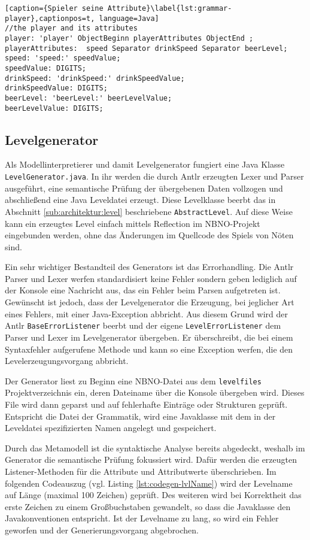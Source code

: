 \begin{lstlisting}[caption={Spieler seine Attribute}\label{lst:grammar-player},captionpos=t, language=Java] 
//the player and its attributes
player: 'player' ObjectBeginn playerAttributes ObjectEnd ;
playerAttributes:  speed Separator drinkSpeed Separator beerLevel;
speed: 'speed:' speedValue;
speedValue: DIGITS;
drinkSpeed: 'drinkSpeed:' drinkSpeedValue;
drinkSpeedValue: DIGITS;
beerLevel: 'beerLevel:' beerLevelValue;
beerLevelValue: DIGITS;
\end{lstlisting}

\subsection{Levelgenerator}

Als Modellinterpretierer und damit Levelgenerator fungiert eine Java Klasse \texttt{LevelGenerator.java}. In ihr werden die durch Antlr erzeugten Lexer und Parser ausgeführt, eine semantische Prüfung der übergebenen Daten vollzogen und abschließend eine Java Leveldatei erzeugt. Diese Levelklasse beerbt das in Abschnitt \ref{sub:architektur:level} beschriebene \texttt{AbstractLevel}. Auf diese Weise kann ein erzeugtes Level einfach mittels Reflection im NBNO-Projekt eingebunden werden, ohne das Änderungen im Quellcode des Spiels von Nöten sind.

Ein sehr wichtiger Bestandteil des Generators ist das \mbox{Errorhandling}. Die Antlr Parser und Lexer werfen standardisiert keine Fehler sondern geben lediglich auf der Konsole eine Nachricht aus, das ein Fehler beim Parsen aufgetreten ist. Gewünscht ist jedoch, dass der Levelgenerator die Erzeugung, bei jeglicher Art eines Fehlers, mit einer Java-Exception abbricht. Aus diesem Grund wird der Antlr \texttt{BaseErrorListener} beerbt und der eigene \texttt{LevelErrorListener} dem Parser und Lexer im Levelgenerator übergeben. Er überschreibt, die bei einem Syntaxfehler aufgerufene Methode und kann so eine Exception werfen, die den Levelerzeugungsvorgang abbricht.

Der Generator liest zu Beginn eine NBNO-Datei aus dem \texttt{levelfiles} Projektverzeichnis ein, deren Dateiname über die Konsole übergeben wird. Dieses File wird dann geparst und auf fehlerhafte Einträge oder Strukturen geprüft. Entspricht die Datei der Grammatik, wird eine Javaklasse mit dem in der Leveldatei spezifizierten Namen angelegt und gespeichert.

Durch das Metamodell ist die syntaktische Analyse bereits abgedeckt, weshalb im Generator die semantische Prüfung fokussiert wird. Dafür werden die erzeugten Listener-Methoden für die Attribute und Attributwerte überschrieben. Im folgenden Codeauszug (vgl. Listing \ref{lst:codegen-lvlName}) wird der Levelname auf Länge (maximal 100 Zeichen) geprüft. Des weiteren wird bei Korrektheit das erste Zeichen zu einem Großbuchstaben gewandelt, so dass die Javaklasse den Javakonventionen entspricht. Ist der Levelname zu lang, so wird ein Fehler geworfen und der Generierungsvorgang abgebrochen.

